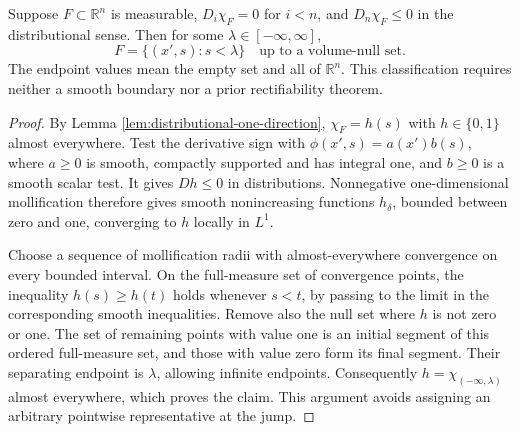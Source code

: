 \begin{lemma}\label{lem:monotone-phase-halfspace}
Suppose $F\subset\mathbb R^n$ is measurable, $D_i\chi_F=0$ for $i<n$, and $D_n\chi_F\leq0$ in the distributional sense. Then for some $\lambda\in[-\infty,\infty]$,
\[
 F=\{(x',s):s<\lambda\}\quad\text{up to a volume-null set}.
\]
The endpoint values mean the empty set and all of $\mathbb R^n$. This classification requires neither a smooth boundary nor a prior rectifiability theorem.
\end{lemma}
\begin{proof}
By Lemma \ref{lem:distributional-one-direction}, $\chi_F=h(s)$ with $h\in\{0,1\}$ almost everywhere. Test the derivative sign with $\phi(x',s)=a(x')b(s)$, where $a\geq0$ is smooth, compactly supported and has integral one, and $b\geq0$ is a smooth scalar test. It gives $Dh\leq0$ in distributions. Nonnegative one-dimensional mollification therefore gives smooth nonincreasing functions $h_\delta$, bounded between zero and one, converging to $h$ locally in $L^1$.

Choose a sequence of mollification radii with almost-everywhere convergence on every bounded interval. On the full-measure set of convergence points, the inequality $h(s)\geq h(t)$ holds whenever $s<t$, by passing to the limit in the corresponding smooth inequalities. Remove also the null set where $h$ is not zero or one. The set of remaining points with value one is an initial segment of this ordered full-measure set, and those with value zero form its final segment. Their separating endpoint is $\lambda$, allowing infinite endpoints. Consequently $h=\chi_{(-\infty,\lambda)}$ almost everywhere, which proves the claim. This argument avoids assigning an arbitrary pointwise representative at the jump.
\end{proof}

